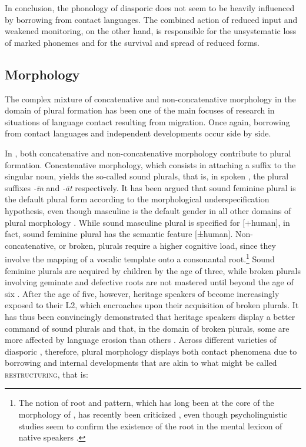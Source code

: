 \documentclass[output=paper]{langsci/langscibook}
\begin{document}
In conclusion, the phonology of diasporic  does not seem to be heavily influenced by borrowing from contact languages. The combined action of reduced input and weakened monitoring, on the other hand, is responsible for the unsystematic loss of marked phonemes and for the survival and spread of reduced forms.


 
 \subsection{Morphology}


The complex mixture of concatenative and {non-concatenative} morphology in the domain of  plural {formation} has been one of the main focuses of research in situations of language contact resulting from migration. Once again, borrowing from contact languages and independent developments occur side by side.

In , both concatenative and {non-concatenative} morphology contribute to plural {formation}. Concatenative morphology, which consists in attaching a suffix to the singular noun, yields the so-called sound plurals, that is, in spoken , the plural suffixes \textit{{}-īn} and \textit{{}-āt} respectively. It has been argued that sound feminine plural is the default plural form according to the morphological underspecification hypothesis, even though masculine is the default {gender} in all other domains of plural morphology \citep[855–856]{AlbiriniBenmamoun2014}. While sound masculine plural is specified for [+human], in fact, sound feminine plural has the semantic feature [±human]. Non-concatenative, or broken, plurals require a higher cognitive load, since they involve the mapping of a vocalic template onto a consonantal {root}.\footnote{The notion of {root and pattern}, which has long been at the core of the morphology of , has recently been criticized \citep{Ratcliffe2013}, even though psycholinguistic studies seem to confirm the existence of the {root} in the mental lexicon of native speakers \citep{Boudelaa2013}.} Sound feminine plurals are acquired by children by the age of three, while broken plurals involving geminate and defective {roots} are not mastered until beyond the age of six \citep[857–858]{AlbiriniBenmamoun2014}.  After the age of five, however, {heritage speakers} of  become increasingly exposed to their L2, which encroaches upon their acquisition of broken plurals. It has thus been convincingly demonstrated that {heritage speakers} display a better command of sound plurals and that, in the domain of broken plurals, some are more affected by {language erosion} than others \citep[858–859]{AlbiriniBenmamoun2014}. Across different varieties of diasporic , therefore, plural morphology displays both contact phenomena due to borrowing and internal developments that are akin to what might be called \textsc{restructuring}, that is:
\end{document}
